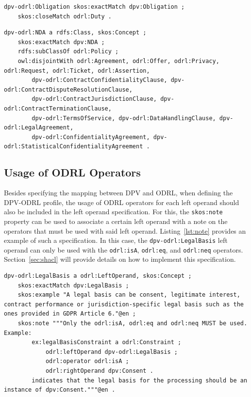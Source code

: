 \begin{scriptsize}
\begin{lstlisting}[language=turtle, caption=DPV-ODRL mapping for the Obligation concept., label=lst:rule]
dpv-odrl:Obligation skos:exactMatch dpv:Obligation ;
	skos:closeMatch odrl:Duty .
\end{lstlisting}
\end{scriptsize}

\begin{scriptsize}
\begin{lstlisting}[language=turtle, caption=DPV-ODRL mapping for the NDA concept., label=lst:policy]
dpv-odrl:NDA a rdfs:Class, skos:Concept ;
    skos:exactMatch dpv:NDA ;
    rdfs:subClassOf odrl:Policy ;
    owl:disjointWith odrl:Agreement, odrl:Offer, odrl:Privacy, odrl:Request, odrl:Ticket, odrl:Assertion,
        dpv-odrl:ContractConfidentialityClause, dpv-odrl:ContractDisputeResolutionClause,
        dpv-odrl:ContractJurisdictionClause, dpv-odrl:ContractTerminationClause,
        dpv-odrl:TermsOfService, dpv-odrl:DataHandlingClause, dpv-odrl:LegalAgreement,
        dpv-odrl:ConfidentialityAgreement, dpv-odrl:StatisticalConfidentialityAgreement .
\end{lstlisting}
\end{scriptsize}

\subsection{Usage of ODRL Operators}
\label{sec:operators}

Besides specifying the mapping
between DPV and ODRL,
when defining the DPV-ODRL profile,
the usage of ODRL operators for
each left operand should also be
included in the left operand specification.
For this,
the \texttt{skos:note} property
can be used to associate a certain left operand
with a note on the operators that must be used
with said left operand.
Listing~\ref{lst:note} provides an example
of such a specification.
In this case,
the \texttt{dpv-odrl:LegalBasis} left operand
can only be used with the
\texttt{odrl:isA},
\texttt{odrl:eq}, and
\texttt{odrl:neq} operators.
Section~\ref{sec:shacl} will provide details
on how to implement this specification.

\begin{scriptsize}
\begin{lstlisting}[language=turtle, caption=Note specification for the usage of operators with the Legal Basis left operand., label=lst:note]
dpv-odrl:LegalBasis a odrl:LeftOperand, skos:Concept ;
	skos:exactMatch dpv:LegalBasis ;
  	skos:example "A legal basis can be consent, legitimate interest, contract performance or jurisdiction-specific legal basis such as the ones provided in GDPR Article 6."@en ;
  	skos:note """Only the odrl:isA, odrl:eq and odrl:neq MUST be used. Example: 
        ex:legalBasisConstraint a odrl:Constraint ;
            odrl:leftOperand dpv-odrl:LegalBasis ;
            odrl:operator odrl:isA ;
            odrl:rightOperand dpv:Consent .
        indicates that the legal basis for the processing should be an instance of dpv:Consent."""@en .
\end{lstlisting}
\end{scriptsize}
